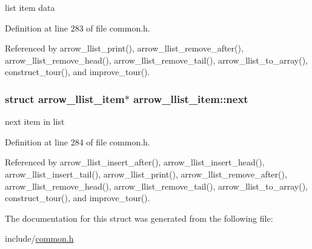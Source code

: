 list item data 

Definition at line 283 of file common.h.

Referenced by arrow\_\-llist\_\-print(), arrow\_\-llist\_\-remove\_\-after(), arrow\_\-llist\_\-remove\_\-head(), arrow\_\-llist\_\-remove\_\-tail(), arrow\_\-llist\_\-to\_\-array(), construct\_\-tour(), and improve\_\-tour().\hypertarget{structarrow__llist__item_81a998b260ab022b05f1ff572327b871}{
\subsubsection{\setlength{\rightskip}{0pt plus 5cm}struct {\bf arrow\_\-llist\_\-item}$\ast$ {\bf arrow\_\-llist\_\-item::next}}}
\label{structarrow__llist__item_81a998b260ab022b05f1ff572327b871}


next item in list 

Definition at line 284 of file common.h.

Referenced by arrow\_\-llist\_\-insert\_\-after(), arrow\_\-llist\_\-insert\_\-head(), arrow\_\-llist\_\-insert\_\-tail(), arrow\_\-llist\_\-print(), arrow\_\-llist\_\-remove\_\-after(), arrow\_\-llist\_\-remove\_\-head(), arrow\_\-llist\_\-remove\_\-tail(), arrow\_\-llist\_\-to\_\-array(), construct\_\-tour(), and improve\_\-tour().

The documentation for this struct was generated from the following file:\begin{CompactItemize}
\item 
include/\hyperlink{common_8h}{common.h}\end{CompactItemize}
